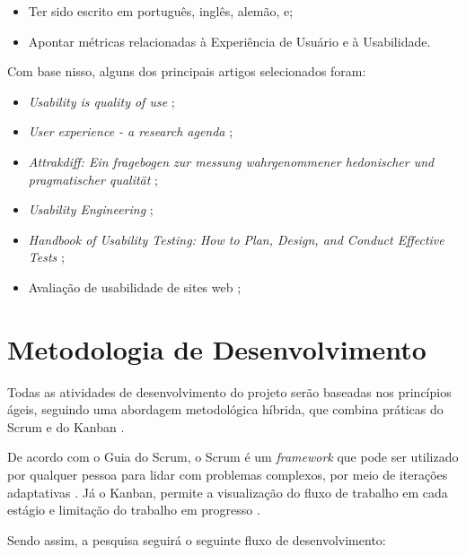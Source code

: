 \begin{itemize}
	\item Ter sido escrito em português, inglês, alemão, e;
	\item Apontar métricas relacionadas à Experiência de Usuário e à Usabilidade.
\end{itemize}

Com base nisso, alguns dos principais artigos selecionados foram:

\begin{itemize}
	\item \textit{Usability is quality of use} \cite{bevan1995};
	\item \textit{User experience - a research agenda} \cite{hassenzahl2006};
	\item \textit{Attrakdiff: Ein fragebogen zur messung wahrgenommener hedonischer und pragmatischer qualität} \cite{hassenzahl2003};
	\item \textit{Usability Engineering} \cite{nielsen1994usability};
	\item \textit{Handbook of Usability Testing: How to Plan, Design, and Conduct Effective Tests} \cite{rubin2011};
	\item Avaliação de usabilidade de sites web \cite{winckler2022};
\end{itemize}

\section{Metodologia de Desenvolvimento}
\label{sec:Metodologia de Desenvolvimento}
Todas as atividades de desenvolvimento do projeto serão baseadas nos princípios ágeis, seguindo uma abordagem metodológica híbrida, que combina práticas do Scrum e do Kanban \cite{totvs2021} \cite{scrumguide2020}. 

De acordo com o Guia do Scrum, o Scrum é um \textit{framework} que pode ser utilizado por qualquer pessoa para lidar com problemas complexos, por meio de iterações adaptativas \cite{scrumguide2020}. Já o Kanban, permite 
a visualização do fluxo de trabalho em cada estágio e limitação do trabalho em progresso \cite{anderson2011}.

Sendo assim, a pesquisa seguirá o seguinte fluxo de desenvolvimento:

